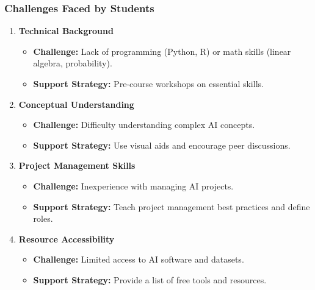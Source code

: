 \documentclass[aspectratio=169]{beamer}
\begin{document}
\begin{frame}[fragile]
    \frametitle{Challenges Faced by Students}
    \begin{enumerate}
        \item \textbf{Technical Background}
            \begin{itemize}
                \item \textbf{Challenge:} Lack of programming (Python, R) or math skills (linear algebra, probability).
                \item \textbf{Support Strategy:} Pre-course workshops on essential skills.
            \end{itemize}
            
        \item \textbf{Conceptual Understanding}
            \begin{itemize}
                \item \textbf{Challenge:} Difficulty understanding complex AI concepts.
                \item \textbf{Support Strategy:} Use visual aids and encourage peer discussions.
            \end{itemize}

        \item \textbf{Project Management Skills}
            \begin{itemize}
                \item \textbf{Challenge:} Inexperience with managing AI projects.
                \item \textbf{Support Strategy:} Teach project management best practices and define roles.
            \end{itemize}

        \item \textbf{Resource Accessibility}
            \begin{itemize}
                \item \textbf{Challenge:} Limited access to AI software and datasets.
                \item \textbf{Support Strategy:} Provide a list of free tools and resources.
            \end{itemize}
    \end{enumerate}
\end{frame}
\end{document}
